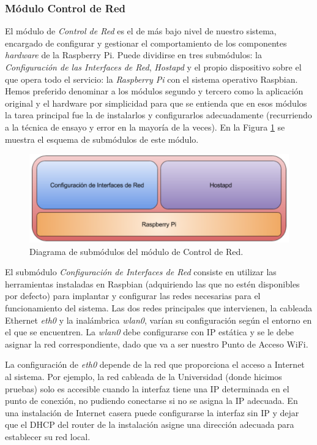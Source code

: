 \subsubsection{Módulo Control de Red}
El módulo de \emph{Control de Red} es el de más bajo nivel de nuestro sistema, encargado de configurar y gestionar el comportamiento de los componentes \emph{hardware} de la Raspberry Pi. Puede dividirse en tres submódulos: la \emph{Configuración de las Interfaces de Red}, \emph{Hostapd} y el propio dispositivo sobre el que opera todo el servicio: la \emph{Raspberry Pi} con el sistema operativo Raspbian. Hemos preferido denominar a los módulos segundo y tercero como la aplicación original y el hardware por simplicidad para que se entienda que en esos módulos la tarea principal fue la de instalarlos y configurarlos adecuadamente (recurriendo a la técnica de ensayo y error en la mayoría de la veces). En la Figura \ref{moduloControlRed} se muestra el esquema de submódulos de este módulo. 

\begin{figure}[!t]
\begin{center}
\includegraphics[width=0.75\linewidth]{./4_AnalisisFuncional/Img/moduloControlRed.png}
\end{center}
\caption{Diagrama de submódulos del módulo de Control de Red.}
\label{moduloControlRed}
\end{figure}

El submódulo \emph{Configuración de Interfaces de Red} consiste en utilizar las herramientas instaladas en Raspbian (adquiriendo las que no estén disponibles por defecto) para implantar y configurar las redes necesarias para el funcionamiento del sistema. Las dos redes principales que intervienen, la cableada Ethernet \emph{eth0} y la inalámbrica \emph{wlan0}, varían su configuración según el entorno en el que se encuentren. La \emph{wlan0} debe configurarse con IP estática y se le debe asignar la red correspondiente, dado que va a ser nuestro Punto de Acceso WiFi.

La configuración de \emph{eth0} depende de la red que proporciona el acceso a Internet al sistema. Por ejemplo, la red cableada de la Universidad (donde hicimos pruebas) solo es accesible cuando la interfaz tiene una IP determinada en el punto de conexión, no pudiendo conectarse si no se asigna la IP adecuada. En una instalación de Internet casera puede configurarse la interfaz sin IP y dejar que el DHCP del router de la instalación asigne una dirección adecuada para establecer su red local.

